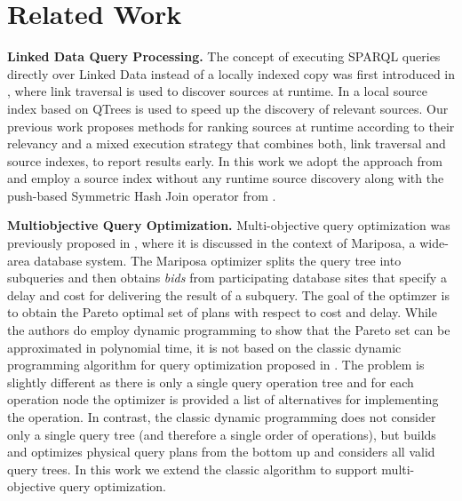 \section{Related Work}
\label{sec:related}

\textbf{Linked Data Query Processing.} The concept of executing SPARQL
queries directly over Linked Data instead of a locally indexed copy
was first introduced in \cite{hartig_executing_2009}, where link
traversal is used to discover sources at runtime. In
\cite{harth_data_2010} a local source index based on QTrees is used to
speed up the discovery of relevant sources. Our previous work
\cite{ladwig_linked_2010,sihjoin_2011} proposes methods for
ranking sources at runtime according to their relevancy and a mixed
execution strategy that combines both, link traversal and source
indexes, to report results early. In this work we adopt the approach
from \cite{harth_data_2010} and employ a source index without any
runtime source discovery along with the push-based Symmetric Hash Join
operator from \cite{ladwig_linked_2010,sihjoin_2011}.





\textbf{Multiobjective Query Optimization.} Multi-objective query
optimization was previously proposed in
\cite{papadimitriou_multiobjective_2001}, where it is discussed in the
context of Mariposa, a wide-area database system. The Mariposa
optimizer splits the query tree into subqueries and then obtains
\emph{bids} from participating database sites that specify a delay and
cost for delivering the result of a subquery. The goal of the optimzer
is to obtain the Pareto optimal set of plans with respect to cost and
delay. While the authors do employ dynamic programming to show that
the Pareto set can be approximated in polynomial time, it is not based
on the classic dynamic programming algorithm for query optimization
proposed in \cite{selinger_access_1979}. The problem is slightly
different as there is only a single query operation tree and for each
operation node the optimizer is provided a list of alternatives for
implementing the operation. In contrast, the classic dynamic
programming \cite{selinger_access_1979} does not consider only a
single query tree (and therefore a single order of operations), but
builds and optimizes physical query plans from the bottom up and
considers all valid query trees. In this work we extend the classic
algorithm to support multi-objective query optimization.


